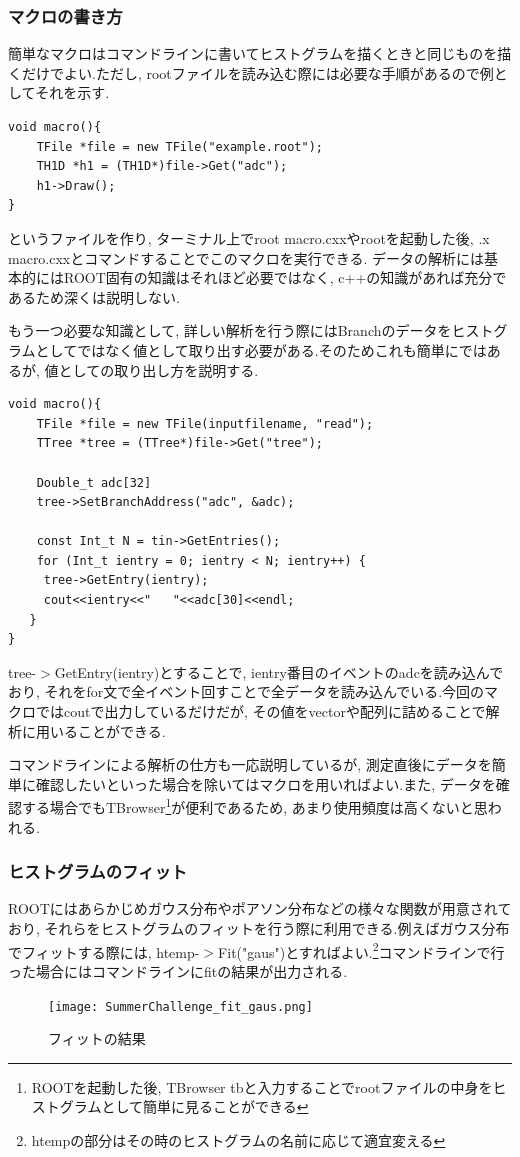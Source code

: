 \subsubsection{マクロの書き方}
簡単なマクロはコマンドラインに書いてヒストグラムを描くときと同じものを描くだけでよい.ただし, rootファイルを読み込む際には必要な手順があるので例としてそれを示す.
\begin{lstlisting}[basicstyle=\ttfamily\footnotesize, frame=single]
void macro(){
	TFile *file = new TFile("example.root");
	TH1D *h1 = (TH1D*)file->Get("adc");
	h1->Draw();
}
 \end{lstlisting}
というファイルを作り, ターミナル上でroot macro.cxxやrootを起動した後, .x macro.cxxとコマンドすることでこのマクロを実行できる.
データの解析には基本的にはROOT固有の知識はそれほど必要ではなく, c++の知識があれば充分であるため深くは説明しない.

もう一つ必要な知識として, 詳しい解析を行う際にはBranchのデータをヒストグラムとしてではなく値として取り出す必要がある.そのためこれも簡単にではあるが, 値としての取り出し方を説明する.

\begin{lstlisting}
void macro(){
    TFile *file = new TFile(inputfilename, "read");
    TTree *tree = (TTree*)file->Get("tree");

    Double_t adc[32]
    tree->SetBranchAddress("adc", &adc);

    const Int_t N = tin->GetEntries();
    for (Int_t ientry = 0; ientry < N; ientry++) {
     tree->GetEntry(ientry);
     cout<<ientry<<"   "<<adc[30]<<endl;
   }
}
 \end{lstlisting}

tree-$>$GetEntry(ientry)とすることで, ientry番目のイベントのadcを読み込んでおり, それをfor文で全イベント回すことで全データを読み込んでいる.今回のマクロではcoutで出力しているだけだが, その値をvectorや配列に詰めることで解析に用いることができる.

コマンドラインによる解析の仕方も一応説明しているが, 測定直後にデータを簡単に確認したいといった場合を除いてはマクロを用いればよい.また, データを確認する場合でもTBrowser\footnote{ROOTを起動した後, TBrowser tbと入力することでrootファイルの中身をヒストグラムとして簡単に見ることができる}が便利であるため, あまり使用頻度は高くないと思われる.

\subsubsection{ヒストグラムのフィット}
ROOTにはあらかじめガウス分布やポアソン分布などの様々な関数が用意されており, それらをヒストグラムのフィットを行う際に利用できる.例えばガウス分布でフィットする際には, htemp-$>$Fit("gaus")とすればよい.\footnote{htempの部分はその時のヒストグラムの名前に応じて適宜変える}コマンドラインで行った場合にはコマンドラインにfitの結果が出力される.
\begin{figure}[h]
  \begin{center}
    \texttt{[image: SummerChallenge\_fit\_gaus.png]}
    \caption{フィットの結果}
    \label{fig:fit_gaus}
  \end{center}
\end{figure}


